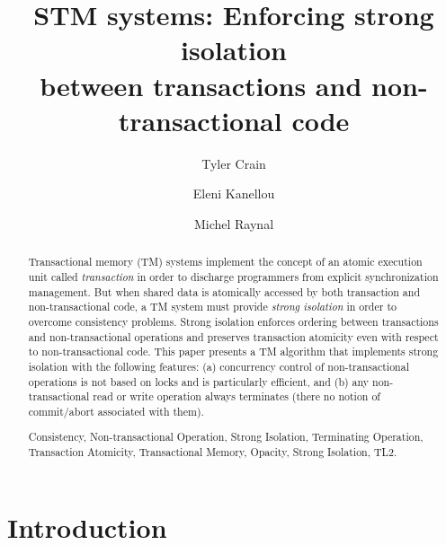 \documentclass[runningheads,a4paper]{llncs}
\newcommand{\keywords}[1]{\par\addvspace\baselineskip
\noindent\keywordname\enspace\ignorespaces#1}
\begin{document}
\mainmatter  

\title{STM systems: Enforcing strong isolation\\
        between transactions and non-transactional code}


\author{Tyler Crain\and Eleni Kanellou\and Michel Raynal}
%



\maketitle


\begin{abstract}
Transactional memory (TM) systems implement the concept of an atomic execution unit called  
{\it transaction} in order to discharge programmers from explicit synchronization management. 
But when shared data is atomically accessed by both transaction and non-transactional code, 
a TM system must provide  {\it strong isolation} in order to overcome consistency problems.
Strong isolation enforces ordering between transactions and non-transactional operations and preserves 
transaction atomicity even with respect to non-transactional code. 
This paper presents a TM algorithm that implements strong isolation with the following features: (a)  
concurrency control of non-transactional operations is not based on locks and is particularly efficient, 
and (b) any non-transactional read or write 
operation always terminates (there no notion of commit/abort associated with them). 
\keywords{Consistency, Non-transactional Operation, Strong Isolation, Terminating Operation, 
Transaction Atomicity, Transactional Memory,  Opacity, Strong Isolation, TL2.}

\end{abstract}

\section{Introduction}
\end{document}
